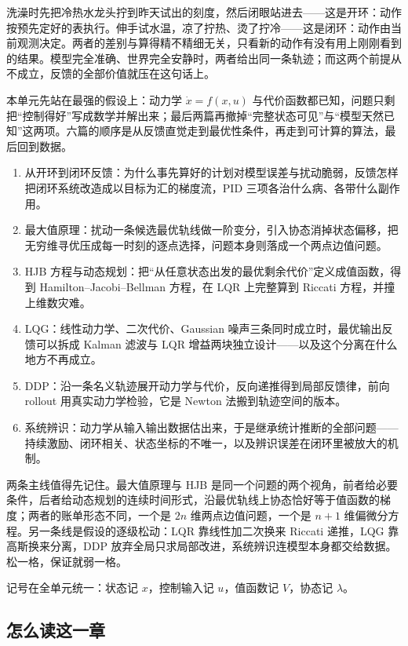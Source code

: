 洗澡时先把冷热水龙头拧到昨天试出的刻度，然后闭眼站进去——这是开环：动作按预先定好的表执行。伸手试水温，凉了拧热、烫了拧冷——这是闭环：动作由当前观测决定。两者的差别与算得精不精细无关，只看新的动作有没有用上刚刚看到的结果。模型完全准确、世界完全安静时，两者给出同一条轨迹；而这两个前提从不成立，反馈的全部价值就压在这句话上。

本单元先站在最强的假设上：动力学 \(\dot x = f(x,u)\) 与代价函数都已知，问题只剩把``控制得好''写成数学并解出来；最后两篇再撤掉``完整状态可见''与``模型天然已知''这两项。六篇的顺序是从反馈直觉走到最优性条件，再走到可计算的算法，最后回到数据。

\begin{enumerate}
\tightlist
\item
  从开环到闭环反馈：为什么事先算好的计划对模型误差与扰动脆弱，反馈怎样把闭环系统改造成以目标为汇的梯度流，PID 三项各治什么病、各带什么副作用。
\item
  最大值原理：扰动一条候选最优轨线做一阶变分，引入协态消掉状态偏移，把无穷维寻优压成每一时刻的逐点选择，问题本身则落成一个两点边值问题。
\item
  HJB 方程与动态规划：把``从任意状态出发的最优剩余代价''定义成值函数，得到 Hamilton--Jacobi--Bellman 方程，在 LQR 上完整算到 Riccati 方程，并撞上维数灾难。
\item
  LQG：线性动力学、二次代价、Gaussian 噪声三条同时成立时，最优输出反馈可以拆成 Kalman 滤波与 LQR 增益两块独立设计——以及这个分离在什么地方不再成立。
\item
  DDP：沿一条名义轨迹展开动力学与代价，反向递推得到局部反馈律，前向 rollout 用真实动力学检验，它是 Newton 法搬到轨迹空间的版本。
\item
  系统辨识：动力学从输入输出数据估出来，于是继承统计推断的全部问题——持续激励、闭环相关、状态坐标的不唯一，以及辨识误差在闭环里被放大的机制。
\end{enumerate}

两条主线值得先记住。最大值原理与 HJB 是同一个问题的两个视角，前者给必要条件，后者给动态规划的连续时间形式，沿最优轨线上协态恰好等于值函数的梯度；两者的账单形态不同，一个是 \(2n\) 维两点边值问题，一个是 \(n+1\) 维偏微分方程。另一条线是假设的逐级松动：LQR 靠线性加二次换来 Riccati 递推，LQG 靠高斯换来分离，DDP 放弃全局只求局部改进，系统辨识连模型本身都交给数据。松一格，保证就弱一格。

记号在全单元统一：状态记 \(x\)，控制输入记 \(u\)，值函数记 \(V\)，协态记 \(\lambda\)。

\subsection{怎么读这一章}

